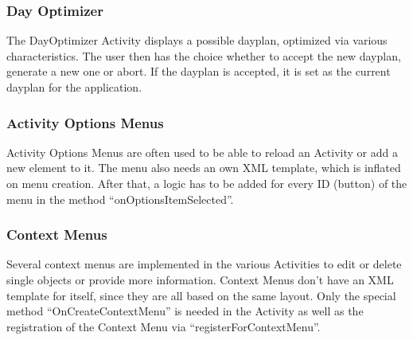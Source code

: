 
\subsubsection{Day Optimizer} %
\label{ssub:DayOptimizer}
The DayOptimizer Activity displays a possible dayplan, optimized via various
characteristics. The user then has the choice whether to accept the new
dayplan, generate a new one or abort. If the dayplan is accepted, it is set
as the current dayplan for the application.


\subsubsection{Activity Options Menus} %
\label{ssub:ActivityMenus}
Activity Options Menus are often used to be able to reload an Activity or add
a new element to it. The menu also needs an own XML template, which is
inflated on menu creation. After that, a logic has to be added for every
ID (button) of the menu in the method ``onOptionsItemSelected''.

\subsubsection{Context Menus} %
\label{ssub:ContextMenus}
Several context menus are implemented in the various Activities to edit or
delete single objects or provide more information. Context Menus don't have
an XML template for itself, since they are all based on the same layout. Only
the special method ``OnCreateContextMenu'' is needed in the Activity as well
as the registration of the Context Menu via ``registerForContextMenu''.


